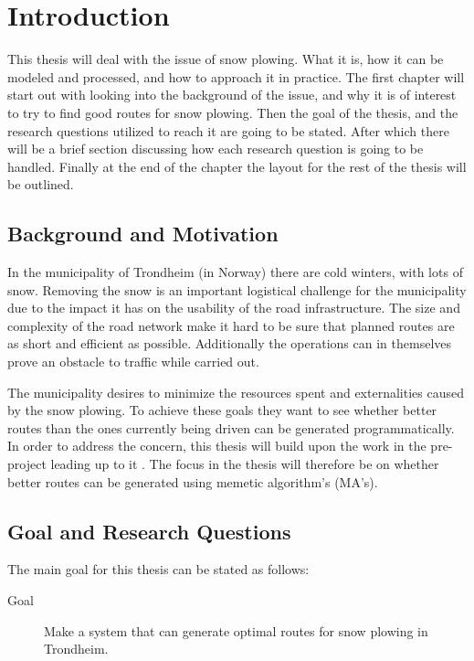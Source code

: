 \chapter{Introduction}
\label{cha:introduction}

This thesis will deal with the issue of snow plowing. What it is, how it can be modeled and processed, and how to approach it in practice. The first chapter will start out with looking into the background of the issue, and why it is of interest to try to find good routes for snow plowing. Then the goal of the thesis, and the research questions utilized to reach it are going to be stated. After which there will be a brief section discussing how each research question is going to be handled. Finally at the end of the chapter the layout for the rest of the thesis will be outlined.

\section{Background and Motivation}

In the municipality of Trondheim (in Norway) there are cold winters, with lots of snow. Removing the snow is an important logistical challenge for the municipality due to the impact it has on the usability of the road infrastructure. The size and complexity of the road network make it hard to be sure that planned routes are as short and efficient as possible. Additionally the operations can in themselves prove an obstacle to traffic while carried out.

The municipality desires to minimize the resources spent and externalities caused by the snow plowing. To achieve these goals they want to see whether better routes than the ones currently being driven can be generated programmatically. In order to address the concern, this thesis will build upon the work in the pre-project leading up to it \citep{forprosjektet}. The focus in the thesis will therefore be on whether better routes can be generated using memetic algorithm's (MA's).

\section{Goal and Research Questions}
\label{sec:goal_and_research_questions}

The main goal for this thesis can be stated as follows:

\begin{description}
    \item [Goal] Make a system that can generate optimal routes for snow plowing in Trondheim.
\end{description}

